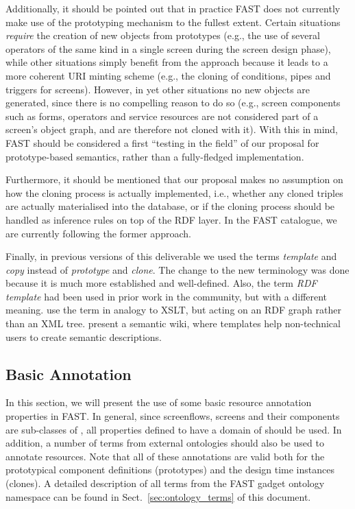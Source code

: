 \documentclass{article}
\begin{document}
Additionally, it should  be pointed out that in practice FAST does not currently make use of the prototyping mechanism to the fullest extent. Certain situations \emph{require} the creation of new objects from prototypes (e.g., the use of several operators of the same kind in a single screen during the screen design phase), while other situations simply benefit from the approach because it leads to a more coherent URI minting scheme (e.g., the cloning of conditions, pipes and triggers for screens). However, in yet other situations no new objects are generated, since there is no compelling reason to do so (e.g., screen components such as forms, operators and service resources are not considered part of a screen's object graph, and are therefore not cloned with it). With this in mind, FAST should be considered a first ``testing in the field'' of our proposal for prototype-based semantics, rather than a fully-fledged implementation.

Furthermore, it should be mentioned that our proposal makes no assumption on how the cloning process is actually implemented, i.e., whether any cloned triples are actually materialised into the database, or if the cloning process should be handled as inference rules on top of the RDF layer. In the FAST catalogue, we are currently following the former approach.

Finally, in previous versions of this deliverable we used the terms \emph{template} and \emph{copy} instead of \emph{prototype} and \emph{clone}. The change to the new terminology was done because it is much more established and well-defined. Also, the term \emph{RDF template} had been used in prior work in the community, but with a different meaning. \cite{davis2003rdf_template} use the term in analogy to XSLT, but acting on an RDF graph rather than an XML tree. \cite{kawamoto2006kawawiki} present a semantic wiki, where templates help non-technical users to create semantic descriptions. 




\subsection{Basic Annotation} %
\label{sub:basic_annotation}

In this section, we will present the use of some basic resource annotation properties in FAST. In general, since screenflows, screens and their components are sub-classes of , all properties defined to have a domain of  should be used. In addition, a number of terms from external ontologies should also be used to annotate resources. Note that all of these annotations are valid both for the prototypical component definitions (prototypes) and the design time instances (clones). A detailed description of all terms from the FAST gadget ontology namespace can be found in Sect.~\ref{sec:ontology_terms} of this document.
\end{document}
